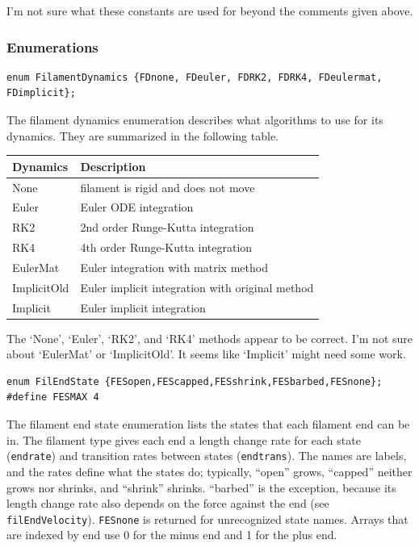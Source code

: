 \documentclass {scrbook}
\newcommand {\ttt} {\texttt}
\begin{document}
I'm not sure what these constants are used for beyond the comments given above.


\subsubsection{Enumerations}

\begin{lstlisting}
enum FilamentDynamics {FDnone, FDeuler, FDRK2, FDRK4, FDeulermat, FDimplicit};
\end{lstlisting}
The filament dynamics enumeration describes what algorithms to use for its dynamics. They are summarized in the following table.
\begin{longtable}[c]{ll}
Dynamics & Description\\
\hline
None & filament is rigid and does not move\\
Euler & Euler ODE integration\\
RK2 & 2nd order Runge-Kutta integration \\
RK4 & 4th order Runge-Kutta integration \\
EulerMat & Euler integration with matrix method \\
ImplicitOld & Euler implicit integration with original method \\
Implicit & Euler implicit integration
\end{longtable}
The `None', `Euler', `RK2', and `RK4' methods appear to be correct. I'm not sure about `EulerMat' or `ImplicitOld'. It seems like `Implicit' might need some work.

\begin{lstlisting}
enum FilEndState {FESopen,FEScapped,FESshrink,FESbarbed,FESnone};
#define FESMAX 4
\end{lstlisting}
The filament end state enumeration lists the states that each filament end can be in. The filament type gives each end a length change rate for each state (\ttt{endrate}) and transition rates between states (\ttt{endtrans}). The names are labels, and the rates define what the states do; typically, ``open'' grows, ``capped'' neither grows nor shrinks, and ``shrink'' shrinks. ``barbed'' is the exception, because its length change rate also depends on the force against the end (see \ttt{filEndVelocity}). \ttt{FESnone} is returned for unrecognized state names. Arrays that are indexed by end use 0 for the minus end and 1 for the plus end.
\end{document}
